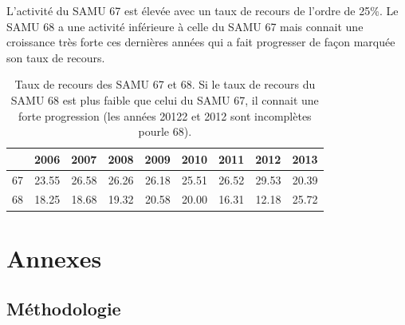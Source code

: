 \documentclass[12pt,english,french,twoside]{report}\usepackage[]{graphicx}\usepackage[]{color}
\begin{document}
L'activité du SAMU 67 est élevée avec un taux de recours de l'ordre de 25\%. Le SAMU 68 a une activité inférieure à celle du SAMU 67 mais connait une croissance très forte ces dernières années qui a fait progresser de façon marquée son taux de recours.

\begin{table}[ht]
\centering
\begin{tabular}{rrrrrrrrr}
  \hline
 & 2006 & 2007 & 2008 & 2009 & 2010 & 2011 & 2012 & 2013 \\ 
  \hline
67 & 23.55 & 26.58 & 26.26 & 26.18 & 25.51 & 26.52 & 29.53 & 20.39 \\ 
  68 & 18.25 & 18.68 & 19.32 & 20.58 & 20.00 & 16.31 & 12.18 & 25.72 \\ 
   \hline
\end{tabular}
\caption[Taux de recours des SAMU]{Taux de recours des SAMU 67 et 68. Si le taux de recours du SAMU 68 est plus faible que celui du SAMU 67, il connait une forte progression (les années 20122 et 2012 sont incomplètes pourle 68).} 
\label{fig.rec}
\end{table}








\part{Annexes}

\newpage
\appendix
\chapter{Méthodologie}

\end{document}
